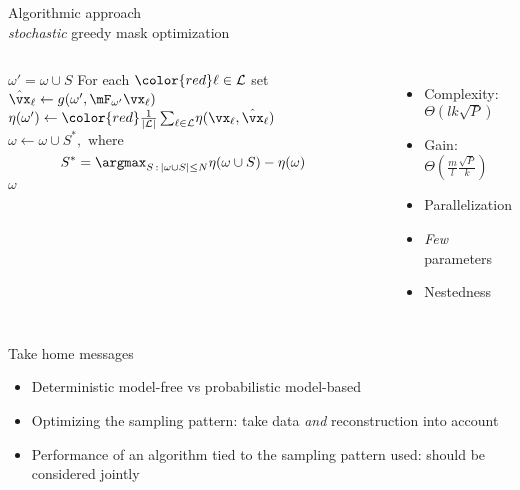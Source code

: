 \begin{frame}{Algorithmic approach\\[-3mm] {\normalsize \textit{stochastic} greedy mask optimization}}
\begin{columns}[T]
\begin{algorithm}[H]
\begin{algorithmic}[1]
        \State  $\omega' = \omega \cup S$ 
        \State For each $ \color{red} \ell \in \mathcal{L}$ set ${\hat{\vx}}_\ell\leftarrow g(\omega', \mF_{\omega'} \vx_\ell)$
        \State   $\eta(\omega') \leftarrow  {\color{red} \frac{1}{|\mathcal{L}|} \sum_{\ell\in\mathcal{L}} }\eta(\vx_\ell, {\hat{\vx}}_\ell)$
 \EndFor
 \State $\displaystyle\omega \leftarrow \omega \cup S^*,  \text{ where }$    
    \vspace{-3mm}
    \begin{equation*}
        S^* = \argmax_{S\,:\,|\omega \cup S| \le N}  \eta(\omega \cup S) - \eta(\omega)%
    \end{equation*}\vspace{-5mm}
    \EndWhile
{} $\omega$ 
\end{algorithmic}
\end{algorithm} 
\vspace{-1.5mm}
\begin{animateinline}{2} %
\end{animateinline}
\vspace{3mm}
\begin{itemize}
\item Complexity: $\Theta(l k \sqrt{P})$
\item Gain: $\Theta\left(\frac{m}{l}\frac{\sqrt{P}}{k}\right)$
\item Parallelization
\item \textit{Few} parameters
\item  Nestedness
\end{itemize}
\end{columns}	
\end{frame}



\begin{frame}{Take home messages}

\begin{itemize}	
\item Deterministic model-free vs probabilistic model-based
\item Optimizing the sampling pattern: take data \textit{and}  reconstruction into account 
\item Performance of an algorithm tied to the sampling pattern used: should be considered jointly
\end{itemize}
\end{frame}
	
